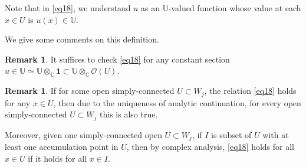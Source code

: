 \documentclass[11pt,b5paper,notitlepage]{article}
\theoremstyle{definition}
\newtheorem{rem}[df]{Remark}
\theoremstyle{plain}
\newcommand{\id}{\mathbf{1}}
\newcommand{\scr}{\mathscr}
\newcommand{\Ubb}{\mathbb U}
\newcommand{\Cbb}{\mathbb C}
\numberwithin{equation}{subsection}
\begin{document}
Note that in \eqref{eq18}, we understand $u$ as an $\Ubb$-valued function whose value at each $x\in U$ is $u(x)\in\Ubb$.

We give some comments on this definition.



\begin{rem}
It suffices to check \eqref{eq18} for any constant section $u\in\Ubb\simeq\Ubb\otimes_\Cbb\id\subset\Ubb\otimes_\Cbb\scr O(U)$.
\end{rem}

\begin{rem}\label{lb9}
If for some open simply-connected $U\subset W_j$, the relation \eqref{eq18} holds for any $x\in U$, then due to the uniqueness of analytic continuation, for every open simply-connected $U\subset W_j$ this is also true.

Moreover, given one simply-connected open $U\subset W_j$, if $I$ is subset of $U$ with at least one accumulation point in $U$, then by complex analysis, \eqref{eq18} holds for all $x\in U$ if it holds for all $x\in I$.
\end{rem}
\end{document}

